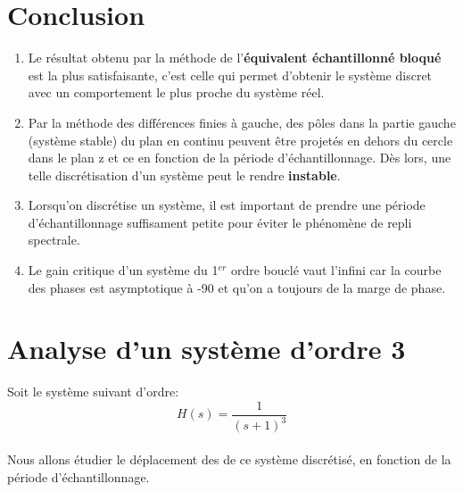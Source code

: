 \section{Conclusion}
\begin{enumerate}
\item Le résultat obtenu par la méthode de l'\textbf{équivalent échantillonné bloqué} est la plus satisfaisante, c'est celle qui permet d'obtenir le système discret avec un comportement le plus proche du système réel.
\item Par la méthode des différences finies à gauche, des pôles dans la partie  gauche (système stable) du plan en continu peuvent être projetés en dehors du cercle dans le plan z et ce en fonction de la période d'échantillonnage. Dès lors, une telle discrétisation d'un système peut le rendre \textbf{instable}.
\item Lorsqu'on discrétise un système, il est important de prendre une période d'échantillonnage suffisament petite pour éviter le phénomène de repli spectrale.
\item Le gain critique d'un système du 1$^{er}$ ordre bouclé vaut l’infini car la courbe des phases est asymptotique à -90 et qu’on a toujours de la marge de phase.
\end{enumerate}

\section{Analyse d'un système d'ordre 3}
Soit le système suivant d'ordre:
\begin{equation*}
H(s) = \frac{1}{(s+1)^{3}}
\end{equation*}

\paragraph{}
Nous allons étudier le déplacement des de ce système discrétisé, en fonction de la période d'échantillonnage.

